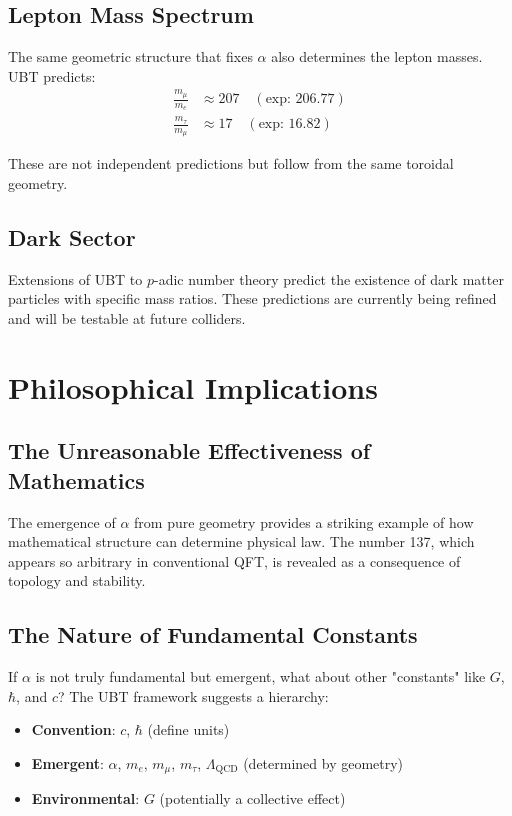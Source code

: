 \documentclass[12pt, a4paper]{article}
\theoremstyle{definition}
\theoremstyle{remark}
\begin{document}
\subsection{Lepton Mass Spectrum}

The same geometric structure that fixes $\alpha$ also determines the lepton masses. UBT predicts:
\begin{align}
\frac{m_\mu}{m_e} &\approx 207 \quad (\text{exp: } 206.77) \\
\frac{m_\tau}{m_\mu} &\approx 17 \quad (\text{exp: } 16.82)
\end{align}

These are not independent predictions but follow from the same toroidal geometry.

\subsection{Dark Sector}

Extensions of UBT to $p$-adic number theory predict the existence of dark matter particles with specific mass ratios. These predictions are currently being refined and will be testable at future colliders.

\section{Philosophical Implications}

\subsection{The Unreasonable Effectiveness of Mathematics}

The emergence of $\alpha$ from pure geometry provides a striking example of how mathematical structure can determine physical law. The number 137, which appears so arbitrary in conventional QFT, is revealed as a consequence of topology and stability.

\subsection{The Nature of Fundamental Constants}

If $\alpha$ is not truly fundamental but emergent, what about other "constants" like $G$, $\hbar$, and $c$? The UBT framework suggests a hierarchy:
\begin{itemize}
\item \textbf{Convention}: $c$, $\hbar$ (define units)
\item \textbf{Emergent}: $\alpha$, $m_e$, $m_\mu$, $m_\tau$, $\Lambda_{\text{QCD}}$ (determined by geometry)
\item \textbf{Environmental}: $G$ (potentially a collective effect)
\end{itemize}
\end{document}
